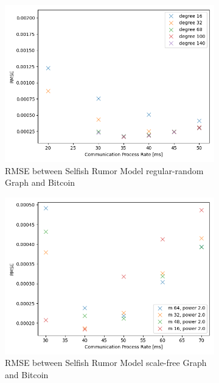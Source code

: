 \begin{figure}[tbp]
	 \begin{subfigure}[b]{0.48\textwidth}
		\includegraphics[width=\textwidth]{figures/RMSE_95.png}
		\caption{RMSE between Selfish Rumor Model regular-random Graph and Bitcoin}
		\label{fig:RMSE}
	\end{subfigure}
	\hfill
	\begin{subfigure}[b]{0.48\textwidth}
		\includegraphics[width=\textwidth]{figures/RMSE_95_barabasi.png}
		\caption{RMSE between Selfish Rumor Model scale-free Graph and Bitcoin}
		\label{fig:RMSEBar}
	\end{subfigure}
	\hfill
	\begin{subfigure}[b]{0.48\textwidth}

\end{subfigure}
\end{figure}

